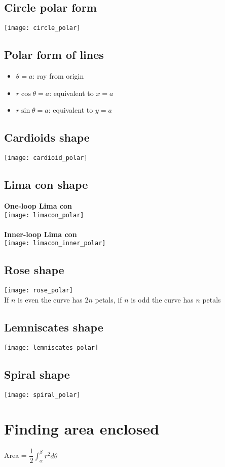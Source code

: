 \subsection{Circle polar form}
\texttt{[image: circle\_polar]}

\subsection{Polar form of lines}
\begin{itemize}
	\item $\theta=a$: ray from origin
	\item $r\cos\theta=a$: equivalent to $x=a$
	\item $r\sin\theta=a$: equivalent to $y=a$
\end{itemize}

\subsection{Cardioids shape}
\texttt{[image: cardioid\_polar]}
\subsection{Lima con shape}
\textbf{One-loop Lima con}\\
\texttt{[image: limacon\_polar]}\\ \\
\textbf{Inner-loop Lima con}\\
\texttt{[image: limacon\_inner\_polar]}
\subsection{Rose shape}
\texttt{[image: rose\_polar]}\\
If $n$ is even the curve has $2n$ petals, if $n$ is odd the curve has $n$ petals

\subsection{Lemniscates shape}
\texttt{[image: lemniscates\_polar]}

\subsection{Spiral shape}
\texttt{[image: spiral\_polar]}




\section{Finding area enclosed}
Area = $\dfrac{1}{2}\int_{\alpha}^{\beta} r^2d\theta$